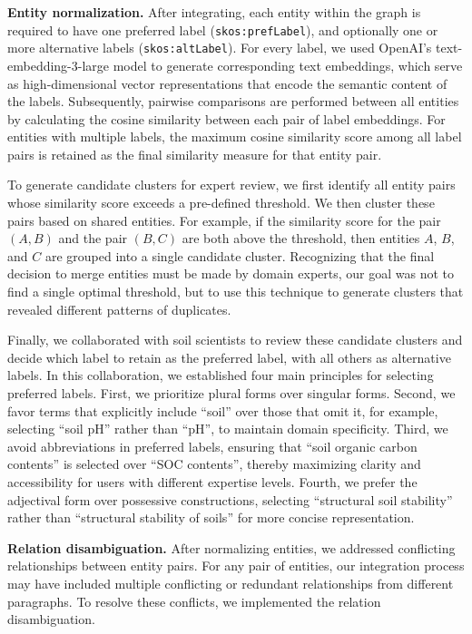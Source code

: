 \documentclass[preprint,12pt]{elsarticle}
\begin{document}
\textbf{Entity normalization.} After integrating, each entity within the graph is required to have one preferred label (\texttt{skos:prefLabel}), and optionally one or more alternative labels (\texttt{skos:altLabel}). For every label, we used OpenAI's text-embedding-3-large model \citep{neelakantan2022textcodeembeddingscontrastive} to generate corresponding text embeddings, which serve as high-dimensional vector representations that encode the semantic content of the labels. Subsequently, pairwise comparisons are performed between all entities by calculating the cosine similarity between each pair of label embeddings. For entities with multiple labels, the maximum cosine similarity score among all label pairs is retained as the final similarity measure for that entity pair.

To generate candidate clusters for expert review, we first identify all entity pairs whose similarity score exceeds a pre-defined threshold. We then cluster these pairs based on shared entities. For example, if the similarity score for the pair $(A, B)$ and the pair $(B, C)$ are both above the threshold, then entities $A$, $B$, and $C$ are grouped into a single candidate cluster. Recognizing that the final decision to merge entities must be made by domain experts, our goal was not to find a single optimal threshold, but to use this technique to generate clusters that revealed different patterns of duplicates.

Finally, we collaborated with soil scientists to review these candidate clusters and decide which label to retain as the preferred label, with all others as alternative labels. In this collaboration, we established four main principles for selecting preferred labels. First, we prioritize plural forms over singular forms. Second, we favor terms that explicitly include ``soil'' over those that omit it, for example, selecting ``soil pH'' rather than ``pH'', to maintain domain specificity. Third, we avoid abbreviations in preferred labels, ensuring that ``soil organic carbon contents'' is selected over ``SOC contents'', thereby maximizing clarity and accessibility for users with different expertise levels. Fourth, we prefer the adjectival form over possessive constructions, selecting ``structural soil stability'' rather than ``structural stability of soils'' for more concise representation.

\textbf{Relation disambiguation.} After normalizing entities, we addressed conflicting relationships between entity pairs. For any pair of entities, our integration process may have included multiple conflicting or redundant relationships from different paragraphs. To resolve these conflicts, we implemented the relation disambiguation.
\end{document}

